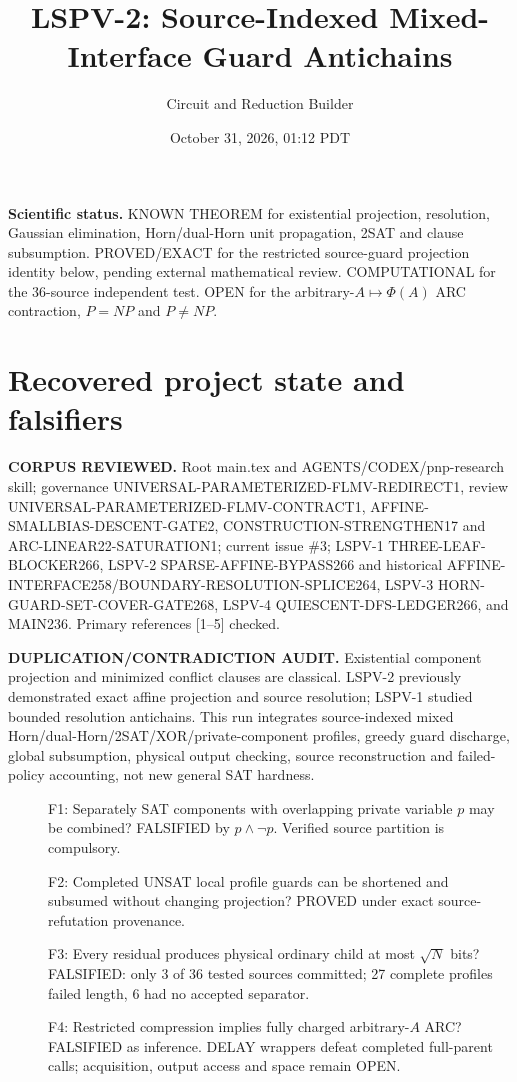 \documentclass[11pt]{article}
\title{LSPV-2: Source-Indexed Mixed-Interface Guard Antichains}
\author{Circuit and Reduction Builder}
\date{October 31, 2026, 01:12 PDT}
\begin{document}
\maketitle
\noindent\textbf{Scientific status.} KNOWN THEOREM for existential projection, resolution, Gaussian elimination, Horn/dual-Horn unit propagation, 2SAT and clause subsumption. PROVED/EXACT for the restricted source-guard projection identity below, pending external mathematical review. COMPUTATIONAL for the 36-source independent test. OPEN for the arbitrary-$A\mapsto\Phi(A)$ ARC contraction, $P=NP$ and $P\ne NP$.

\section{Recovered project state and falsifiers}
\noindent\textbf{CORPUS REVIEWED.} Root main.tex and AGENTS/CODEX/pnp-research skill; governance UNIVERSAL-PARAMETERIZED-FLMV-REDIRECT1, review UNIVERSAL-PARAMETERIZED-FLMV-CONTRACT1, AFFINE-SMALLBIAS-DESCENT-GATE2, CONSTRUCTION-STRENGTHEN17 and ARC-LINEAR22-SATURATION1; current issue \#3; LSPV-1 THREE-LEAF-BLOCKER266, LSPV-2 SPARSE-AFFINE-BYPASS266 and historical AFFINE-INTERFACE258/BOUNDARY-RESOLUTION-SPLICE264, LSPV-3 HORN-GUARD-SET-COVER-GATE268, LSPV-4 QUIESCENT-DFS-LEDGER266, and MAIN236. Primary references [1--5] checked.

\noindent\textbf{DUPLICATION/CONTRADICTION AUDIT.} Existential component projection and minimized conflict clauses are classical. LSPV-2 previously demonstrated exact affine projection and source resolution; LSPV-1 studied bounded resolution antichains. This run integrates source-indexed mixed Horn/dual-Horn/2SAT/XOR/private-component profiles, greedy guard discharge, global subsumption, physical output checking, source reconstruction and failed-policy accounting, not new general SAT hardness.

\begin{description}
\item[] F1: Separately SAT components with overlapping private variable $p$ may be combined? FALSIFIED by $p\wedge\neg p$. Verified source partition is compulsory.
\item[] F2: Completed UNSAT local profile guards can be shortened and subsumed without changing projection? PROVED under exact source-refutation provenance.
\item[] F3: Every residual produces physical ordinary child at most $\sqrt N$ bits? FALSIFIED: only 3 of 36 tested sources committed; 27 complete profiles failed length, 6 had no accepted separator.
\item[] F4: Restricted compression implies fully charged arbitrary-$A$ ARC? FALSIFIED as inference. DELAY wrappers defeat completed full-parent calls; acquisition, output access and space remain OPEN.
\end{description}
\end{document}
